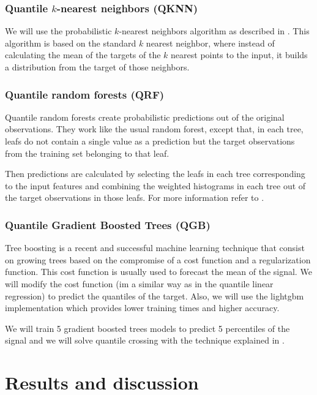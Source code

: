 \documentclass[a4paper,twocolumn,5p]{elsarticle}
\begin{document}
\subsubsection{Quantile $k$-nearest neighbors (QKNN)}

We will use the probabilistic $k$-nearest neighbors algorithm as
described in \cite{quantileknnmangalova}.  This algorithm is based on
the standard $k$ nearest neighbor, where instead of calculating the
mean of the targets of the $k$ nearest points to the input, it builds
a distribution from the target of those neighbors.

\subsubsection{Quantile random forests (QRF)}

Quantile random forests create probabilistic predictions out of the
original observations. They work like the usual random forest, except
that, in each tree, leafs do not contain a single value as a
prediction but the target observations from the training set belonging
to that
leaf.

Then predictions are calculated by selecting the leafs in each tree
corresponding to the input features and combining the weighted
histograms in each tree out of the target observations in those leafs.
For more information refer to \cite{quantregforests}.

\subsubsection{Quantile Gradient Boosted Trees (QGB)}

Tree boosting \cite{friedman_greedy_2001} is a recent and successful
machine learning technique that consist on growing trees based on the
compromise of a cost function and a regularization function. This cost
function is usually used to forecast the mean of the signal. We will
modify the cost function (im a similar way as in the quantile linear
regression) to predict the quantiles of the target. Also, we will use 
the lightgbm implementation \cite{ke_lightgbm:_2017} which provides 
lower training times and higher accuracy.

We will train 5 gradient boosted trees models to predict 5 percentiles
of the \no signal and we will solve quantile 
crossing with the technique
explained in \cite{cross}.

\section{Results and discussion}
\label{sec:results}
\end{document}
